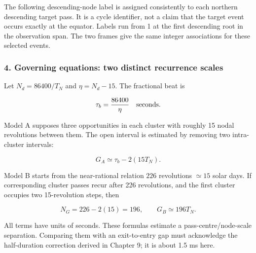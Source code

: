 \documentclass[10pt,a4paper]{article}
\numberwithin{equation}{section}
\begin{document}
\begin{sloppypar}The following descending-node label is assigned consistently to each northern descending target pass. It is a cycle identifier, not a claim that the target event occurs exactly at the equator. Labels run from 1 at the first descending root in the observation span. The two frames give the same integer associations for these selected events.\end{sloppypar}


\subsubsection*{4. Governing equations: two distinct recurrence scales}

\begin{sloppypar}Let \(N_d=86400/T_N\) and \(\eta=N_d-15\). The fractional beat is\end{sloppypar}


\begin{equation}\tau_b=\frac{86400}{\eta}
\quad{\rm seconds}.\label{eq:ch5-6}\end{equation}

\begin{sloppypar}Model A supposes three opportunities in each cluster with roughly 15 nodal revolutions between them. The open interval is estimated by removing two intra-cluster intervals:\end{sloppypar}


\begin{equation}G_A\simeq\tau_b-2(15T_N).\label{eq:discrete-a}\end{equation}

\begin{sloppypar}Model B starts from the near-rational relation \(226\) revolutions \(\simeq15\) solar days. If corresponding cluster passes recur after 226 revolutions, and the first cluster occupies two 15-revolution steps, then\end{sloppypar}


\begin{equation}N_G=226-2(15)=196,\qquad G_B\simeq196T_N.\label{eq:discrete-b}\end{equation}

\begin{sloppypar}All terms have units of seconds. These formulas estimate a pass-centre/node-scale separation. Comparing them with an exit-to-entry gap must acknowledge the half-duration correction derived in Chapter 9; it is about 1.5 ms here.\end{sloppypar}
\end{document}
